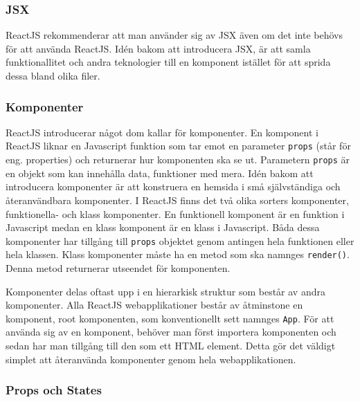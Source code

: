 
\subsubsection{JSX}
ReactJS rekommenderar att man använder sig av JSX även om det inte behövs för att använda ReactJS. Idén bakom att introducera JSX, är att samla funktionallitet och andra teknologier till en komponent istället för att sprida dessa bland olika filer. \cite{react-jsx}


\subsubsection{Komponenter}
ReactJS introducerar något dom kallar för komponenter. En komponent i ReactJS liknar en Javascript funktion som tar emot en parameter \texttt{props} (står för eng. properties) och returnerar hur komponenten ska se ut. Parametern \texttt{props} är en objekt som kan innehålla data, funktioner med mera. Idén bakom att introducera komponenter är att konstruera en hemsida i små självständiga och återanvändbara komponenter. \cite{react-components} I ReactJS finns det två olika sorters komponenter, funktionella- och klass komponenter. En funktionell komponent är en funktion i Javascript medan en klass komponent är en klass i Javascript. Båda dessa komponenter har tillgång till \texttt{props} objektet genom antingen hela funktionen eller hela klassen. Klass komponenter måste ha en metod som ska namnges \texttt{render()}. Denna metod returnerar utseendet för komponenten.

Komponenter delas oftast upp i en hierarkisk struktur som består av andra komponenter. Alla ReactJS webapplikationer består av åtminstone en komponent, root komponenten, som konventionellt sett namnges \texttt{App}. För att använda sig av en komponent, behöver man först importera komponenten och sedan har man tillgång till den som ett HTML element. Detta gör det väldigt simplet att återanvända komponenter genom hela webapplikationen.

\subsubsection{Props och States} 


